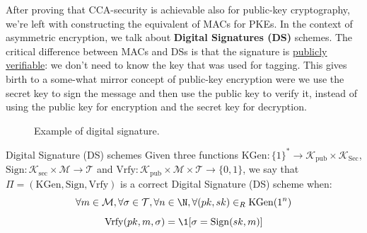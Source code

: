 \documentclass[a4paper, 12pt]{report}
\begin{document}
    After proving that CCA-security is achievable also for public-key cryptography, we're left with constructing the equivalent of MACs for PKEs. In the context of asymmetric encryption, we talk about \textbf{Digital Signatures (DS)} schemes. The critical difference between MACs and DSs is that the signature is \underline{publicly verifiable}: we don't need to know the key that was used for tagging. This gives birth to a some-what mirror concept of public-key encryption were we use the secret key to sign the message and then use the public key to verify it, instead of using the public key for encryption and the secret key for decryption.
    
    \begin{figure}[H]
        \centering


        \caption{Example of digital signature.}
    \end{figure}

    \begin{frameddefn}{Digital Signature (DS) schemes}
        Given three functions $\mathrm{KGen} : \{1\}^* \to \mathcal{K}_{\mathrm{pub}} \times \mathcal{K}_\mathrm{Sec}$, $\mathrm{Sign} : \mathcal{K}_{\mathrm{sec}} \times \mathcal{M} \to \mathcal{T}$ and $\mathrm{Vrfy} : \mathcal{K}_{\mathrm{pub}} \times \mathcal{M} \times \mathcal{T} \to \{0,1\}$, we say that $\Pi = (\mathrm{KGen}, \mathrm{Sign}, \mathrm{Vrfy})$ is a correct Digital Signature (DS) scheme when:
        \[\forall m \in \mathcal{M}, \forall \sigma \in \mathcal{T}, \forall n \in \N, \forall (pk,sk) \in_R \mathrm{KGen}(1^n)\] \[\mathrm{Vrfy}(pk, m, \sigma) = \1[\sigma = \mathrm{Sign}(sk, m)]\]
    \end{frameddefn}
\end{document}
